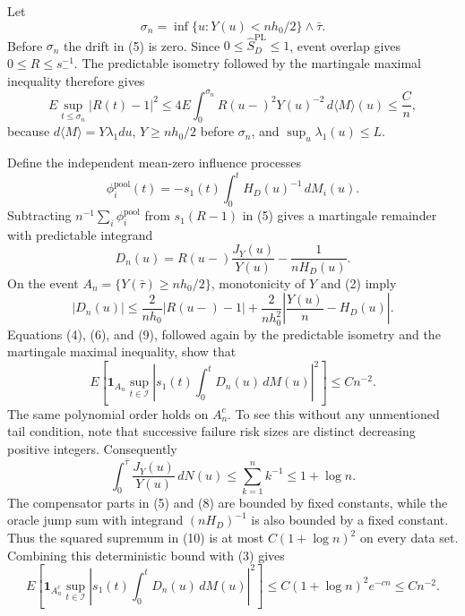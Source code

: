 Let
\[
 \sigma_n=\inf\{u:Y(u)<nh_0/2\}\wedge\bar\tau.
\]
Before \(\sigma_n\) the drift in (5) is zero.  Since
\(0\le\widehat S_D^{\mathrm{PL}}\le1\), event overlap gives
\(0\le R\le s_-^{-1}\).  The predictable isometry followed by the martingale maximal inequality therefore gives
\[
 E\sup_{t\le\sigma_n}|R(t)-1|^2
 \le 4E\int_0^{\sigma_n}
 R(u-)^2Y(u)^{-2}\,d\langle M\rangle(u)
 \le \frac Cn,                                         \tag{6}
\]
because \(d\langle M\rangle=Y\lambda_1du\),
\(Y\ge nh_0/2\) before \(\sigma_n\), and
\(\sup_u\lambda_1(u)\le L\).

Define the independent mean-zero influence processes
\[
 \phi_i^{\mathrm{pool}}(t)
 =-s_1(t)\int_0^tH_D(u)^{-1}\,dM_i(u).                 \tag{7}
\]
Subtracting \(n^{-1}\sum_i\phi_i^{\mathrm{pool}}\) from \(s_1(R-1)\) in (5) gives a martingale remainder with predictable integrand
\[
 D_n(u)=R(u-)\frac{J_Y(u)}{Y(u)}-\frac1{nH_D(u)}.       \tag{8}
\]
On the event
\(A_n=\{Y(\bar\tau)\ge nh_0/2\}\), monotonicity of \(Y\) and (2) imply
\[
 |D_n(u)|
 \le \frac{2}{nh_0}|R(u-)-1|
 +\frac{2}{nh_0^2}
   \left|\frac{Y(u)}n-H_D(u)\right|.                  \tag{9}
\]
Equations (4), (6), and (9), followed again by the predictable isometry and the martingale maximal inequality, show that
\[
 E\left[\mathbf 1_{A_n}
 \sup_{t\in\mathcal I}
 \left|s_1(t)\int_0^tD_n(u)\,dM(u)\right|^2\right]
 \le Cn^{-2}.                                          \tag{10}
\]
The same polynomial order holds on \(A_n^c\).  To see this without any unmentioned tail condition, note that successive failure risk sizes are distinct decreasing positive integers.  Consequently
\[
 \int_0^{\bar\tau}\frac{J_Y(u)}{Y(u)}\,dN(u)
 \le\sum_{k=1}^n k^{-1}\le1+\log n.                   \tag{11}
\]
The compensator parts in (5) and (8) are bounded by fixed constants, while the oracle jump sum with integrand \((nH_D)^{-1}\) is also bounded by a fixed constant.  Thus the squared supremum in (10) is at most
\(C(1+\log n)^2\) on every data set.  Combining this deterministic bound with (3) gives
\[
 E\left[\mathbf 1_{A_n^c}
 \sup_{t\in\mathcal I}
 \left|s_1(t)\int_0^tD_n(u)\,dM(u)\right|^2\right]
 \le C(1+\log n)^2e^{-cn}\le Cn^{-2}.                 \tag{12}
\]

